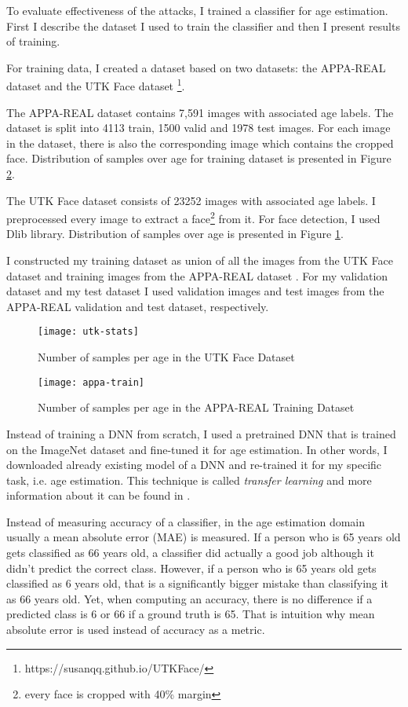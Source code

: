 To evaluate effectiveness of the attacks, I trained a classifier for age estimation. 
First I describe the dataset I used to train the classifier and then I present results of training. 

For training data, I created a dataset based on two datasets: the APPA-REAL dataset \cite{agustsson2017appareal}  and the UTK Face dataset \footnote{https://susanqq.github.io/UTKFace/}.

The APPA-REAL dataset contains 7,591 images with associated age labels. The dataset is split into 4113 train, 1500 valid and 1978 test images. For each image in the dataset, there is also the corresponding image which contains the cropped face. Distribution of samples over age for training dataset is presented in Figure \ref{fig:appa-train-stats}.

The UTK Face dataset consists of 23252 images with associated age labels. I preprocessed every image to extract a face\footnote{every face is cropped with 40\% margin} from it. For face detection, I used Dlib \cite{dlib09} library. Distribution of samples over age is presented in Figure \ref{fig:utk-stats}.

I constructed my training dataset as union of all the images from the UTK Face dataset and training images from the APPA-REAL dataset . For my validation dataset and my test dataset I used validation images and test images from the APPA-REAL validation and test dataset, respectively. 

\begin{figure}[h]
\texttt{[image: utk-stats]}
\caption{Number of samples per age in the UTK Face Dataset}
\label{fig:utk-stats}
\end{figure}

\begin{figure}[h]
\texttt{[image: appa-train]}
\caption{Number of samples per age in the APPA-REAL Training Dataset}
\label{fig:appa-train-stats}
\end{figure}

Instead of training a DNN from scratch, I used a pretrained DNN that is trained on the ImageNet dataset and fine-tuned it for age estimation. In other words, I downloaded already existing model of a DNN and re-trained it for my specific task, i.e. age estimation. This technique is called \textit{transfer learning} and more information about it can be found in \cite{yosinski2014transferable}.

Instead of measuring accuracy of a classifier, in the age estimation domain usually a mean absolute error (MAE) is measured. If a person who is 65 years old gets classified as 66 years old, a classifier did actually a good job although it didn't predict the correct class. However, if a person who is 65 years old gets classified as 6 years old, that is a significantly bigger mistake than classifying it as 66 years old. Yet, when computing an accuracy, there is no difference if a predicted class is 6 or 66 if a ground truth is 65. That is intuition why mean absolute error is used instead of accuracy as a metric.

